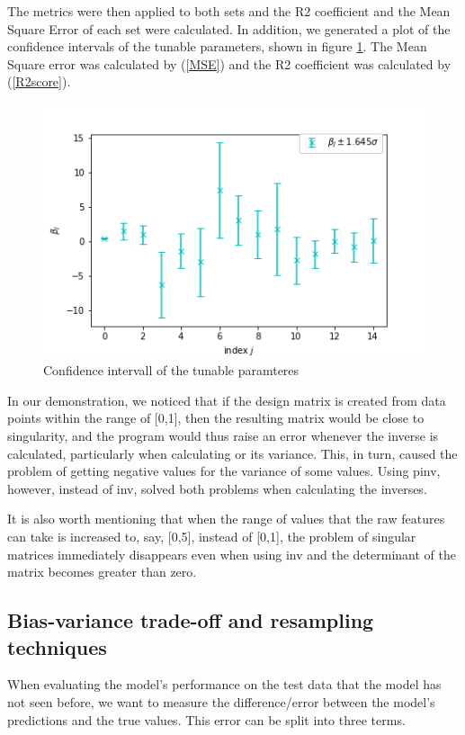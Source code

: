 \documentclass{article}
\begin{document}
The metrics were then applied to both sets and the R2 coefficient and the Mean Square Error of each set were calculated. In addition, we generated a plot of the confidence intervals of the tunable parameters, shown in figure \ref{fig:confintOLS}. The Mean Square error was calculated by (\ref{MSE}) and the R2 coefficient was calculated by (\ref{R2score}).
\begin{figure}
\includegraphics[scale=0.5]{confidenceintervall.png}
\centering
\caption{Confidence intervall of the tunable paramteres}
\label{fig:confintOLS}
\end{figure}
In our demonstration, we noticed that if the design matrix is created from data points within the range of [0,1], then the resulting  matrix would be close to singularity, and the program would thus raise an error whenever the inverse is calculated, particularly when calculating  or its variance. This, in turn, caused the problem of getting negative values for the variance of some values. Using pinv, however, instead of inv, solved both problems when calculating the inverses.

It is also worth mentioning that when the range of values that the raw features can take is increased to, say, [0,5], instead of [0,1], the problem of singular matrices immediately disappears even when using inv and the determinant of the matrix  becomes greater than zero.



\subsection{Bias-variance trade-off and resampling techniques}
When evaluating the model’s performance on the test data that the model has not seen before, we want to measure the difference/error between the model’s predictions and the true values. This error can be split into three terms.
\end{document}
